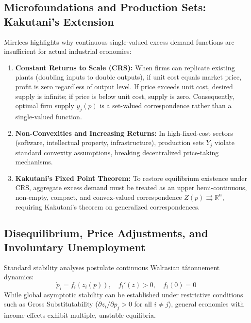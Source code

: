 \documentclass[11pt,a4paper]{article}
\begin{document}
\subsection{Microfoundations and Production Sets: Kakutani's Extension}
Mirrlees highlights why continuous single-valued excess demand functions are insufficient for actual industrial economies:
\begin{enumerate}
    \item \textbf{Constant Returns to Scale (CRS):} When firms can replicate existing plants (doubling inputs to double outputs), if unit cost equals market price, profit is zero regardless of output level. If price exceeds unit cost, desired supply is infinite; if price is below unit cost, supply is zero. Consequently, optimal firm supply $y_j(p)$ is a set-valued correspondence rather than a single-valued function.
    \item \textbf{Non-Convexities and Increasing Returns:} In high-fixed-cost sectors (software, intellectual property, infrastructure), production sets $Y_j$ violate standard convexity assumptions, breaking decentralized price-taking mechanisms.
    \item \textbf{Kakutani's Fixed Point Theorem:} To restore equilibrium existence under CRS, aggregate excess demand must be treated as an upper hemi-continuous, non-empty, compact, and convex-valued correspondence $Z(p) \rightrightarrows \mathbb{R}^n$, requiring Kakutani's theorem on generalized correspondences.
\end{enumerate}

\subsection{Disequilibrium, Price Adjustments, and Involuntary Unemployment}
Standard stability analyses postulate continuous Walrasian tâtonnement dynamics:
\begin{equation}
\dot{p}_i = f_i(z_i(p)), \quad f_i'(z) > 0, \quad f_i(0) = 0
\end{equation}
While global asymptotic stability can be established under restrictive conditions such as Gross Substitutability ($\partial z_i / \partial p_j > 0$ for all $i \ne j$), general economies with income effects exhibit multiple, unstable equilibria.
\end{document}
